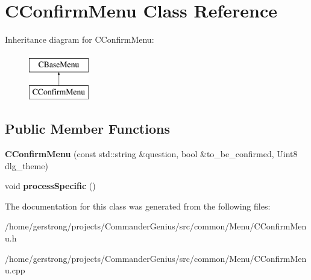 \hypertarget{class_c_confirm_menu}{
\section{CConfirmMenu Class Reference}
\label{class_c_confirm_menu}
}
Inheritance diagram for CConfirmMenu:\begin{figure}[H]
\begin{center}
\leavevmode
\includegraphics[height=2cm]{class_c_confirm_menu}
\end{center}
\end{figure}
\subsection*{Public Member Functions}
\begin{DoxyCompactItemize}
\item 
\hypertarget{class_c_confirm_menu_a57a600675e433878254c6b6bf593ca4e}{
{\bfseries CConfirmMenu} (const std::string \&question, bool \&to\_\-be\_\-confirmed, Uint8 dlg\_\-theme)}
\label{class_c_confirm_menu_a57a600675e433878254c6b6bf593ca4e}

\item 
\hypertarget{class_c_confirm_menu_a9b0df98890fa30551ac680fd698203c2}{
void {\bfseries processSpecific} ()}
\label{class_c_confirm_menu_a9b0df98890fa30551ac680fd698203c2}

\end{DoxyCompactItemize}


The documentation for this class was generated from the following files:\begin{DoxyCompactItemize}
\item 
/home/gerstrong/projects/CommanderGenius/src/common/Menu/CConfirmMenu.h\item 
/home/gerstrong/projects/CommanderGenius/src/common/Menu/CConfirmMenu.cpp\end{DoxyCompactItemize}
